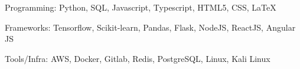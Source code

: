 

\begin{cvskills}

  \cvskill
    {Programming:} %
    {Python, SQL, Javascript, Typescript, HTML5, CSS, LaTeX} %


  \cvskill
    {Frameworks:} %
    {Tensorflow, Scikit-learn, Pandas, Flask, NodeJS, ReactJS, Angular JS} %

  \cvskill
    {Tools/Infra:} %
    {AWS, Docker, Gitlab, Redis, PostgreSQL, Linux, Kali Linux} %


\end{cvskills}

